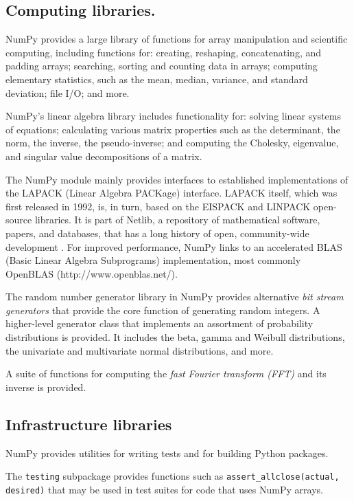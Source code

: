 \subsection*{Computing libraries.}

NumPy provides a large library of functions for array manipulation
and scientific computing, including functions for: creating, reshaping,
concatenating, and padding arrays; searching, sorting and counting data
in arrays; computing elementary statistics, such as the mean, median,
variance, and standard deviation; file I/O; and more.

NumPy's linear algebra library includes functionality for: solving
linear systems of equations; calculating various matrix properties
such as the determinant, the norm, the inverse, the pseudo-inverse;
and computing the Cholesky, eigenvalue, and singular value
decompositions of a matrix.

The NumPy module mainly provides interfaces to established
implementations of the LAPACK (Linear Algebra PACKage) \cite{LAPACK}
interface.  LAPACK itself, which was first released in 1992, is, in
turn, based on the EISPACK and LINPACK open-source libraries. It is
part of Netlib, a repository of mathematical software, papers, and
databases, that has a long history of open, community-wide
development \cite{dongarra1990lapack,dongarra2008netlib}. For improved
performance, NumPy links to an accelerated BLAS (Basic Linear Algebra
Subprograms) implementation, most commonly OpenBLAS
(http://www.openblas.net/).

The random number generator library in NumPy provides alternative
\emph{bit stream generators} that provide the core function of generating
random integers.
A higher-level generator class that implements an assortment of
probability distributions is provided. It includes the beta, gamma
and Weibull distributions, the univariate and multivariate normal
distributions, and more.

A suite of functions for computing the \emph{fast Fourier transform (FFT)}
and its inverse is provided.

\subsection*{Infrastructure libraries}

NumPy provides utilities for writing tests and for building Python packages.

The \texttt{testing} subpackage provides functions such as
\texttt{assert\_allclose(actual, desired)} that may be used in
test suites for code that uses NumPy arrays.

